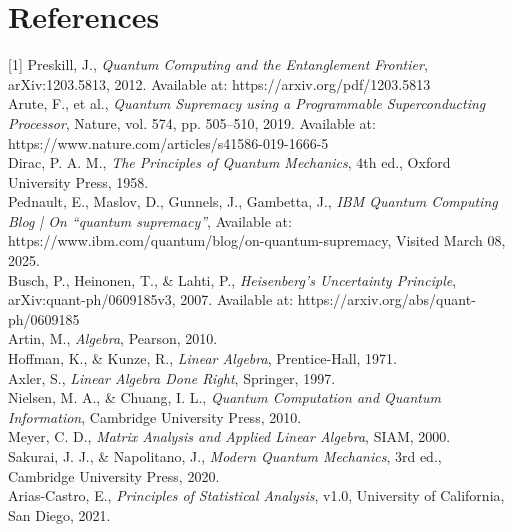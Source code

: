 \chapter*{References}

[1] Preskill, J., \textit{Quantum Computing and the Entanglement Frontier}, arXiv:1203.5813, 2012. Available at: https://arxiv.org/pdf/1203.5813\\

\noindent[2] Arute, F., et al., \textit{Quantum Supremacy using a Programmable Superconducting Processor}, Nature, vol. 574, pp. 505–510, 2019. Available at: https://www.nature.com/articles/s41586-019-1666-5\\

\noindent[3] Dirac, P. A. M., \textit{The Principles of Quantum Mechanics}, 4th ed., Oxford University Press, 1958.\\

\noindent[4] Pednault, E., Maslov, D., Gunnels, J., Gambetta, J., \textit{IBM Quantum Computing Blog | On “quantum supremacy”}, Available at: https://www.ibm.com/quantum/blog/on-quantum-supremacy, Visited March 08, 2025.\\

\noindent [5] Busch, P., Heinonen, T., \& Lahti, P., \textit{Heisenberg's Uncertainty Principle}, arXiv:quant-ph/0609185v3, 2007. Available at: https://arxiv.org/abs/quant-ph/0609185 \\

\noindent[6] Artin, M., \textit{Algebra}, Pearson, 2010.\\

\noindent[7] Hoffman, K., \& Kunze, R., \textit{Linear Algebra}, Prentice-Hall, 1971.\\

\noindent[8] Axler, S., \textit{Linear Algebra Done Right}, Springer, 1997.\\

\noindent[9] Nielsen, M. A., \& Chuang, I. L., \textit{Quantum Computation and Quantum Information}, Cambridge University Press, 2010.\\

\noindent[10] Meyer, C. D., \textit{Matrix Analysis and Applied Linear Algebra}, SIAM, 2000.\\

\noindent[11] Sakurai, J. J., \& Napolitano, J., \textit{Modern Quantum Mechanics}, 3rd ed., Cambridge University Press, 2020.\\

\noindent[12] Arias-Castro, E., \textit{Principles of Statistical Analysis}, v1.0, University of California, San Diego, 2021.\\

